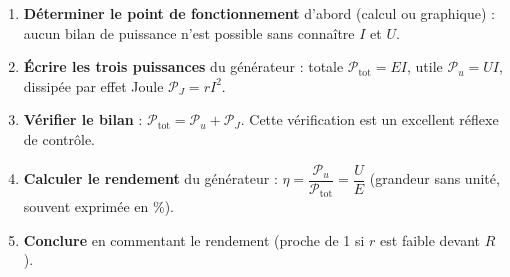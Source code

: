\documentclass[11pt]{article}
\begin{document}
\begin{methode}
\begin{enumerate}
\item \textbf{Déterminer le point de fonctionnement} d'abord (calcul ou graphique) : aucun bilan de puissance n'est possible sans connaître $I$ et $U$.
\item \textbf{Écrire les trois puissances} du générateur : totale $\mathcal{P}_{\text{tot}} = EI$, utile $\mathcal{P}_u = UI$, dissipée par effet Joule $\mathcal{P}_J = rI^2$.
\item \textbf{Vérifier le bilan} : $\mathcal{P}_{\text{tot}} = \mathcal{P}_u + \mathcal{P}_J$. Cette vérification est un excellent réflexe de contrôle.
\item \textbf{Calculer le rendement} du générateur : $\eta = \dfrac{\mathcal{P}_u}{\mathcal{P}_{\text{tot}}} = \dfrac{U}{E}$ (grandeur sans unité, souvent exprimée en \%).
\item \textbf{Conclure} en commentant le rendement (proche de 1 si $r$ est faible devant $R$).
\end{enumerate}
\end{methode}
\end{document}
